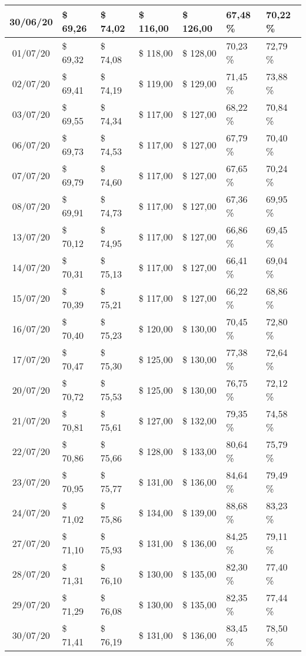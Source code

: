 \begin{center}
\begin{longtable}{|c|p{1.5cm}|p{1.5cm}|p{1.5cm}|p{1.5cm}|p{1.5cm}|p{1.5cm}|}
30/06/20 & \$ 69,26 & \$ 74,02 & \$ 116,00 & \$ 126,00 & 67,48 \% & 70,22 \% \\ \hline
01/07/20 & \$ 69,32 & \$ 74,08 & \$ 118,00 & \$ 128,00 & 70,23 \% & 72,79 \% \\ \hline
02/07/20 & \$ 69,41 & \$ 74,19 & \$ 119,00 & \$ 129,00 & 71,45 \% & 73,88 \% \\ \hline
03/07/20 & \$ 69,55 & \$ 74,34 & \$ 117,00 & \$ 127,00 & 68,22 \% & 70,84 \% \\ \hline
06/07/20 & \$ 69,73 & \$ 74,53 & \$ 117,00 & \$ 127,00 & 67,79 \% & 70,40 \% \\ \hline
07/07/20 & \$ 69,79 & \$ 74,60 & \$ 117,00 & \$ 127,00 & 67,65 \% & 70,24 \% \\ \hline
08/07/20 & \$ 69,91 & \$ 74,73 & \$ 117,00 & \$ 127,00 & 67,36 \% & 69,95 \% \\ \hline
13/07/20 & \$ 70,12 & \$ 74,95 & \$ 117,00 & \$ 127,00 & 66,86 \% & 69,45 \% \\ \hline
14/07/20 & \$ 70,31 & \$ 75,13 & \$ 117,00 & \$ 127,00 & 66,41 \% & 69,04 \% \\ \hline
15/07/20 & \$ 70,39 & \$ 75,21 & \$ 117,00 & \$ 127,00 & 66,22 \% & 68,86 \% \\ \hline
16/07/20 & \$ 70,40 & \$ 75,23 & \$ 120,00 & \$ 130,00 & 70,45 \% & 72,80 \% \\ \hline
17/07/20 & \$ 70,47 & \$ 75,30 & \$ 125,00 & \$ 130,00 & 77,38 \% & 72,64 \% \\ \hline
20/07/20 & \$ 70,72 & \$ 75,53 & \$ 125,00 & \$ 130,00 & 76,75 \% & 72,12 \% \\ \hline
21/07/20 & \$ 70,81 & \$ 75,61 & \$ 127,00 & \$ 132,00 & 79,35 \% & 74,58 \% \\ \hline
22/07/20 & \$ 70,86 & \$ 75,66 & \$ 128,00 & \$ 133,00 & 80,64 \% & 75,79 \% \\ \hline
23/07/20 & \$ 70,95 & \$ 75,77 & \$ 131,00 & \$ 136,00 & 84,64 \% & 79,49 \% \\ \hline
24/07/20 & \$ 71,02 & \$ 75,86 & \$ 134,00 & \$ 139,00 & 88,68 \% & 83,23 \% \\ \hline
27/07/20 & \$ 71,10 & \$ 75,93 & \$ 131,00 & \$ 136,00 & 84,25 \% & 79,11 \% \\ \hline
28/07/20 & \$ 71,31 & \$ 76,10 & \$ 130,00 & \$ 135,00 & 82,30 \% & 77,40 \% \\ \hline
29/07/20 & \$ 71,29 & \$ 76,08 & \$ 130,00 & \$ 135,00 & 82,35 \% & 77,44 \% \\ \hline
30/07/20 & \$ 71,41 & \$ 76,19 & \$ 131,00 & \$ 136,00 & 83,45 \% & 78,50 \% \\ \hline

\end{longtable}
\end{center}
